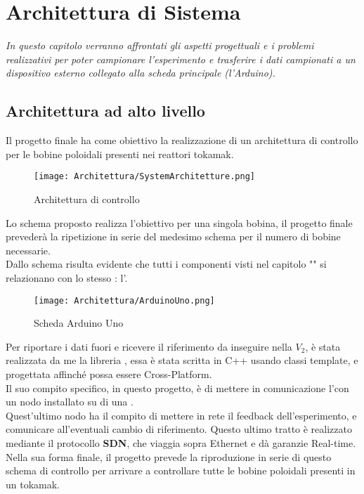 \chapter{Architettura di Sistema}\label{cap:Architettura}

\begin{minipage}{12cm}\textit{
		In questo capitolo verranno affrontati gli aspetti progettuali e i problemi realizzativi per poter campionare l'esperimento e trasferire i dati campionati a un dispositivo esterno collegato alla scheda principale (l'Arduino).
	}
\end{minipage}

\vspace*{1cm}

\section{Architettura ad alto livello}\label{sec:architettura}
Il progetto finale ha come obiettivo la realizzazione di un architettura di controllo per le bobine poloidali presenti nei reattori tokamak.

\begin{figure}[h] \label{fig:archietturaControllo}
	\centering
	\caption[Schema finale dell'archiettettura di controllo]{Architettura di controllo}
	\texttt{[image: Architettura/SystemArchitetture.png]}
\end{figure}

\noindent
Lo schema proposto realizza l'obiettivo per una singola bobina, il progetto finale prevederà la ripetizione in serie del medesimo schema per il numero di bobine necessarie.\\
Dallo schema risulta evidente che tutti i componenti visti nel capitolo "" si relazionano con lo stesso \microControllore: l'\ArduinoUno.
\begin{figure}[h]
	\centering
	\caption[Scheda Arduino Uno]{Scheda Arduino Uno}
	\texttt{[image: Architettura/ArduinoUno.png]}
\end{figure}

\noindent
Per riportare i dati fuori e ricevere il riferimento da inseguire nella $V_2$, è stata realizzata da me la libreria \cite*{EMP}, essa è stata scritta in C++ usando classi template, e progettata affinché possa essere Cross-Platform.\\
Il suo compito specifico, in questo progetto, è di mettere in comunicazione l'\ArduinoUno con un nodo \MARTe installato su di una \Rasp.\\
Quest'ultimo nodo ha il compito di mettere in rete il feedback dell'esperimento, e comunicare all'\ArduinoUno eventuali cambio di riferimento. Questo ultimo tratto è realizzato mediante il protocollo \textbf{SDN}, che viaggia sopra Ethernet e dà garanzie Real-time.\\
Nella sua forma finale, il progetto prevede la riproduzione in serie di questo schema di controllo per arrivare a controllare tutte le bobine poloidali presenti in un tokamak.

